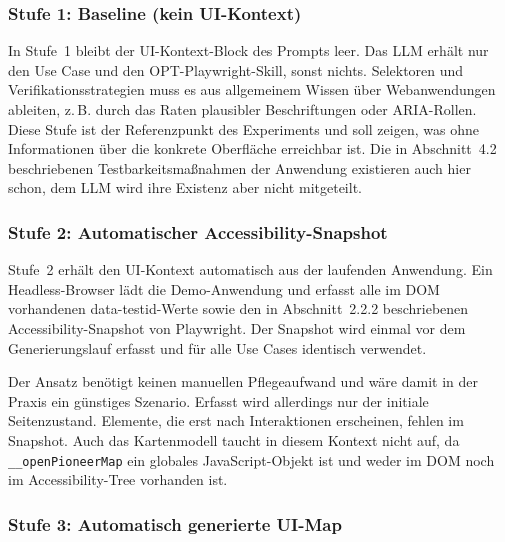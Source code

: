 \subsubsection{Stufe 1: Baseline (kein UI-Kontext)}

In Stufe~1 bleibt der \ac{UI}-Kontext-Block des Prompts leer. Das \ac{LLM} erhält nur den Use Case und den OPT-Playwright-Skill, sonst nichts. Selektoren und Verifikationsstrategien muss es aus allgemeinem Wissen über Webanwendungen ableiten, z.\,B. durch das Raten plausibler Beschriftungen oder \ac{ARIA}-Rollen. Diese Stufe ist der Referenzpunkt des Experiments und soll zeigen, was ohne Informationen über die konkrete Oberfläche erreichbar ist. Die in Abschnitt~4.2 beschriebenen Testbarkeitsmaßnahmen der Anwendung existieren auch hier schon, dem \ac{LLM} wird ihre Existenz aber nicht mitgeteilt.

\subsubsection{Stufe 2: Automatischer Accessibility-Snapshot}

Stufe~2 erhält den \ac{UI}-Kontext automatisch aus der laufenden Anwendung. Ein Headless-Browser lädt die Demo-Anwendung und erfasst alle im \ac{DOM} vorhandenen data-testid-Werte sowie den in Abschnitt~2.2.2 beschriebenen Accessibility-Snapshot von Playwright. Der Snapshot wird einmal vor dem Generierungslauf erfasst und für alle Use Cases identisch verwendet.

Der Ansatz benötigt keinen manuellen Pflegeaufwand und wäre damit in der Praxis ein günstiges Szenario. Erfasst wird allerdings nur der initiale Seitenzustand. Elemente, die erst nach Interaktionen erscheinen, fehlen im Snapshot. Auch das Kartenmodell taucht in diesem Kontext nicht auf, da \texttt{\_\_openPioneerMap} ein globales JavaScript-Objekt ist und weder im \ac{DOM} noch im Accessibility-Tree vorhanden ist.

\subsubsection{Stufe 3: Automatisch generierte UI-Map}

